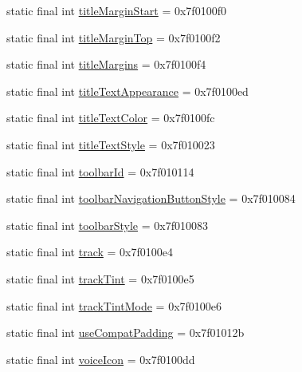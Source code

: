 \begin{CompactItemize}
\item 
static final int \hyperlink{classandroid_1_1support_1_1fragment_1_1_r_1_1attr_6d6fabb1565d093b11bfe1d14f845633}{titleMarginStart} = 0x7f0100f0
\item 
static final int \hyperlink{classandroid_1_1support_1_1fragment_1_1_r_1_1attr_66b7cef201bffe8c304f2607e681f68b}{titleMarginTop} = 0x7f0100f2
\item 
static final int \hyperlink{classandroid_1_1support_1_1fragment_1_1_r_1_1attr_495838ac431ccdeb0dce2a98cac982c1}{titleMargins} = 0x7f0100f4
\item 
static final int \hyperlink{classandroid_1_1support_1_1fragment_1_1_r_1_1attr_fd265c15a80c9fc508a70aba6ff65049}{titleTextAppearance} = 0x7f0100ed
\item 
static final int \hyperlink{classandroid_1_1support_1_1fragment_1_1_r_1_1attr_6155a531661f29d0aa2d45252ff13314}{titleTextColor} = 0x7f0100fc
\item 
static final int \hyperlink{classandroid_1_1support_1_1fragment_1_1_r_1_1attr_2ea0b694e59d34ad1f76c1f59827ccc4}{titleTextStyle} = 0x7f010023
\item 
static final int \hyperlink{classandroid_1_1support_1_1fragment_1_1_r_1_1attr_e3a0995cf206582680bb6f7d6807b590}{toolbarId} = 0x7f010114
\item 
static final int \hyperlink{classandroid_1_1support_1_1fragment_1_1_r_1_1attr_95af52e36f48eef0d248ddd52c2db99e}{toolbarNavigationButtonStyle} = 0x7f010084
\item 
static final int \hyperlink{classandroid_1_1support_1_1fragment_1_1_r_1_1attr_b158db203a56b4296c49b4a97881977f}{toolbarStyle} = 0x7f010083
\item 
static final int \hyperlink{classandroid_1_1support_1_1fragment_1_1_r_1_1attr_eff03d5bd60e16875269ae40b6c25961}{track} = 0x7f0100e4
\item 
static final int \hyperlink{classandroid_1_1support_1_1fragment_1_1_r_1_1attr_d4d347675284feb4302c139659c0bf19}{trackTint} = 0x7f0100e5
\item 
static final int \hyperlink{classandroid_1_1support_1_1fragment_1_1_r_1_1attr_b27c8e40ba55504ce5d1baa1fd963e95}{trackTintMode} = 0x7f0100e6
\item 
static final int \hyperlink{classandroid_1_1support_1_1fragment_1_1_r_1_1attr_7cfbc93c6f3c00aa0c8c65c70bd59c83}{useCompatPadding} = 0x7f01012b
\item 
static final int \hyperlink{classandroid_1_1support_1_1fragment_1_1_r_1_1attr_b81072e3293f88ed1b6f6a661b95bb29}{voiceIcon} = 0x7f0100dd

\end{CompactItemize}
